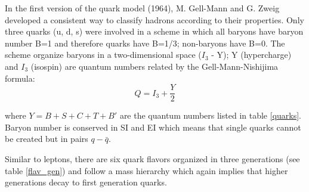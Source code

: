 \noindent In the first version of the quark model (1964), M. Gell-Mann\cite{gellman} and G. Zweig\cite{zweig,zweig2} developed a consistent way to classify hadrons according to their properties. Only three quarks (u, d, s) were involved in a scheme in which all baryons have baryon number B=1 and therefore quarks have B=1/3; non-baryons have B=0. The scheme organize baryons in a two-dimensional space ($I_3$ - Y); Y (hypercharge) and $I_3$ (isospin) are quantum numbers related by the Gell-Mann-Nishijima formula\cite{gell_ni,gell_ni2}:
\begin{equation}
Q=I_3 + \frac{Y}{2}
\label{gmn}
\end{equation}

\noindent where $Y=B+S+C+T+B'$ are the quantum numbers listed in table \ref{quarks}. Baryon number is conserved in SI and EI which means that single quarks cannot be created but in pairs $q-\bar{q}$.

\noindent Similar to leptons, there are six quark flavors organized in three generations (see table \ref{flav_gen}) and follow a mass hierarchy which again implies that higher generations decay to first generation quarks.

